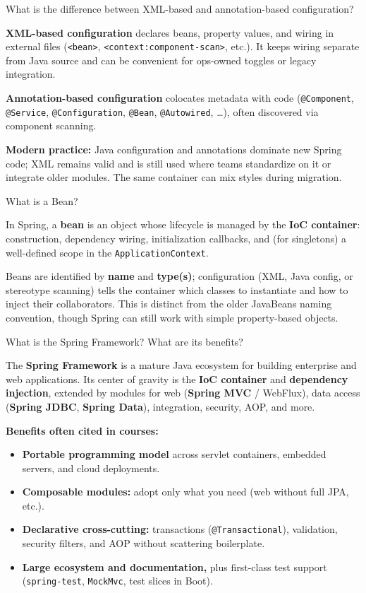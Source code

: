 \question[4]
What is the difference between XML-based and annotation-based configuration?
\begin{solutionorbox}[1.35in]
  \textbf{XML-based configuration} declares beans, property values, and wiring in external files (\texttt{<bean>}, \texttt{<context:component-scan>}, etc.). It keeps wiring separate from Java source and can be convenient for ops-owned toggles or legacy integration.

  \textbf{Annotation-based configuration} colocates metadata with code (\texttt{@Component}, \texttt{@Service}, \texttt{@Configuration}, \texttt{@Bean}, \texttt{@Autowired}, \ldots), often discovered via component scanning.

  \noindent\textbf{Modern practice:} Java configuration and annotations dominate new Spring code; XML remains valid and is still used where teams standardize on it or integrate older modules. The same container can mix styles during migration.
\end{solutionorbox}

\question[4]
What is a Bean?
\begin{solutionorbox}[1.05in]
  In Spring, a \textbf{bean} is an object whose lifecycle is managed by the \textbf{IoC container}: construction, dependency wiring, initialization callbacks, and (for singletons) a well-defined scope in the \texttt{ApplicationContext}.

  Beans are identified by \textbf{name} and \textbf{type(s)}; configuration (XML, Java config, or stereotype scanning) tells the container which classes to instantiate and how to inject their collaborators. This is distinct from the older JavaBeans naming convention, though Spring can still work with simple property-based objects.
\end{solutionorbox}

\question[4]
What is the Spring Framework? What are its benefits?
\begin{solutionorbox}[1.35in]
  The \textbf{Spring Framework} is a mature Java ecosystem for building enterprise and web applications. Its center of gravity is the \textbf{IoC container} and \textbf{dependency injection}, extended by modules for web (\textbf{Spring MVC} / WebFlux), data access (\textbf{Spring JDBC}, \textbf{Spring Data}), integration, security, AOP, and more.

  \noindent\textbf{Benefits often cited in courses:}
  \begin{itemize}
    \item \textbf{Portable programming model} across servlet containers, embedded servers, and cloud deployments.
    \item \textbf{Composable modules:} adopt only what you need (web without full JPA, etc.).
    \item \textbf{Declarative cross-cutting:} transactions (\texttt{@Transactional}), validation, security filters, and AOP without scattering boilerplate.
    \item \textbf{Large ecosystem and documentation,} plus first-class test support (\texttt{spring-test}, \texttt{MockMvc}, test slices in Boot).
  \end{itemize}
\end{solutionorbox}

